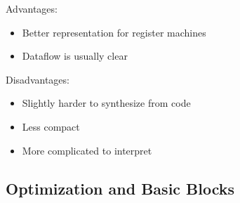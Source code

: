 \documentclass{plt}
\begin{document}
\begin{frame}


Advantages:

\begin{itemize}
\item Better representation for register machines

\item Dataflow is usually clear
\end{itemize}

Disadvantages:

\begin{itemize}
\item Slightly harder to synthesize from code

\item Less compact

\item More complicated to interpret
\end{itemize}

\end{frame}

\subsection{Optimization and Basic Blocks}
\end{document}
